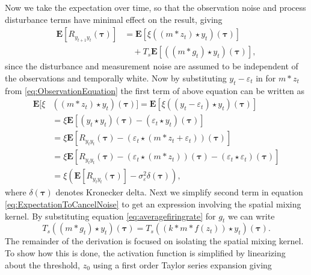 \documentclass[10pt,twocolumn,twoside]{IEEEtran}
\begin{document}
Now we take the expectation over time, so that the observation noise and process disturbance terms have minimal effect on the result, giving 
\begin{align}\label{eq:ExpectationToCancelNoise}
	\mathbf{E}[R_{y_{t+1}y_t}(\boldsymbol{\tau})] &= \mathbf{E}[\xi\left(\left(m \ast z_t\right) \star y_t \right)(\boldsymbol{\tau})] \nonumber \\
	 &\quad+ T_s \mathbf{E}[\left(\left(m\ast g_t\right)\star y_t \right)(\boldsymbol{\tau})],
\end{align}
since the disturbance and measurement noise are assumed to be independent of the observations and temporally white. Now by substituting $y_t - \varepsilon_t$   in for $m\ast z_t$ from \eqref{eq:ObservationEquation} the first term of above equation can be written as
\begin{align}
	\mathbf{E}[\xi&\left(\left(m \ast z_t \right) \star y_t \right)(\boldsymbol{\tau})] = \mathbf{E}\left[\xi\left(\left(y_t-\varepsilon_t\right) \star y_t \right)(\boldsymbol{\tau})\right] \nonumber \\
	&= \xi \mathbf{E}\left[ (y_t \star y_t)(\boldsymbol{\tau}) - \left(\varepsilon_t\star y_t \right)(\boldsymbol{\tau})\right] \nonumber \\
	&= \xi\mathbf{E}[ R_{y_ty_t}(\boldsymbol{\tau})  - \left(\varepsilon_t \star (m\ast z_t + \varepsilon_t)\right) (\boldsymbol{\tau})] \nonumber \\
	&=\xi\mathbf{E}[ R_{y_ty_t}(\boldsymbol{\tau}) -\left(\varepsilon_t\star (m\ast z_t)\right)(\boldsymbol{\tau}) - (\varepsilon_t\star\varepsilon_t)(\boldsymbol{\tau})] \nonumber\\ 
	&= \xi\left(\mathbf{E}[ R_{y_ty_t}(\boldsymbol{\tau})] - \sigma_{\varepsilon}^2 \delta(\boldsymbol{\tau})\right), \label{eq:FirstTermReduced}
\end{align}
where $\delta(\boldsymbol\tau)$ denotes Kronecker delta. Next we simplify second term in equation \eqref{eq:ExpectationToCancelNoise} to get an expression involving the spatial mixing kernel. By substituting equation \eqref{eq:averagefiringrate} for $g_t$ we can write
\begin{equation}\label{eq:before_linearization}
	T_s((m \ast g_t) \star y_t)(\boldsymbol\tau) = T_s((k \ast m\ast f(z_t)) \star y_t)(\boldsymbol\tau).
\end{equation}   
The remainder of the derivation is focused on isolating the spatial mixing kernel. To show how this is done, the activation function is simplified by linearizing about the threshold, $z_0$ using a first order Taylor series expansion giving
\end{document}
